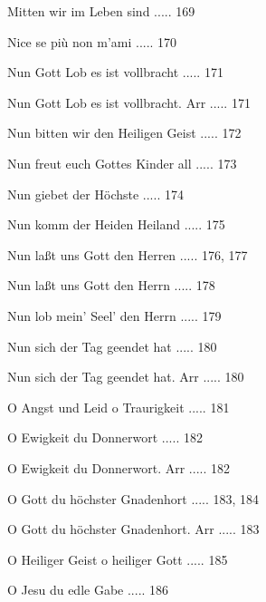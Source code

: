 \documentclass[twocolumn]{book}
\begin{document}
\newline 
Mitten wir im Leben sind ..... 169

\newline 
Nice se più non m'ami ..... 170

\newline 
Nun Gott Lob es ist vollbracht ..... 171

\newline 
Nun Gott Lob es ist vollbracht. Arr ..... 171

\newline 
Nun bitten wir den Heiligen Geist ..... 172

\newline 
Nun freut euch Gottes Kinder all ..... 173

\newline 
Nun giebet der Höchste ..... 174

\newline 
Nun komm der Heiden Heiland ..... 175

\newline 
Nun laßt uns Gott den Herren ..... 176, 177

\newline 
Nun laßt uns Gott den Herrn ..... 178

\newline 
Nun lob mein' Seel' den Herrn ..... 179

\newline 
Nun sich der Tag geendet hat ..... 180

\newline 
Nun sich der Tag geendet hat. Arr ..... 180

\newline 
O Angst und Leid o Traurigkeit ..... 181

\newline 
O Ewigkeit du Donnerwort ..... 182

\newline 
O Ewigkeit du Donnerwort. Arr ..... 182

\newline 
O Gott du höchster Gnadenhort ..... 183, 184

\newline 
O Gott du höchster Gnadenhort. Arr ..... 183

\newline 
O Heiliger Geist o heiliger Gott ..... 185

\newline 
O Jesu du edle Gabe ..... 186
\end{document}
